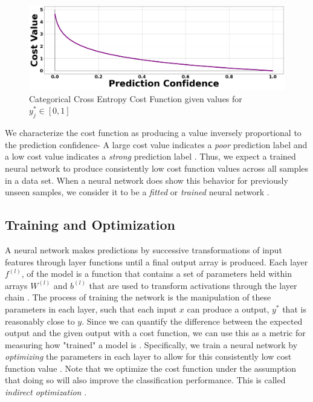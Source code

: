 \documentclass[conference,onecolumn,letterpaper]{IEEEtran}
\begin{document}
\begin{figure}[h]
    \centering
    \includegraphics[scale=0.14]{figures/CXELoss.png}
    \caption{Categorical Cross Entropy Cost Function given values for $y^*_{j} \in [0,1]$}
    \label{fig:CXELoss}
\end{figure}

We characterize the cost function as producing a value inversely proportional to the prediction confidence- A large cost value indicates a \textit{poor} prediction label and a low cost value indicates a \textit{strong} prediction label \cite{James,Virtanen}. Thus, we expect a trained neural network to produce consistently low cost function values across all samples in a data set. When a neural network does show this behavior for previously unseen samples, we consider it to be a \textit{fitted} or \textit{trained} neural network \cite{Geron,Goodfellow,James}.


\subsection{Training and Optimization}
\label{subsec:Training}

A neural network makes predictions by successive transformations of input features through layer functions until a final output array is produced. Each layer $f^{(l)}$, of the model is a function that contains a set of parameters held within arrays $W^{(l)}$ and $b^{(l)}$ that are used to transform activations through the layer chain \cite{Goodfellow}. The process of training the network is the manipulation of these parameters in each layer, such that each input $x$ can produce a output, $y^*$ that is reasonably close to $y$. Since we can quantify the difference between the expected output and the given output with a cost function, we can use this as a metric for measuring how "trained" a model is \cite{James}. Specifically, we train a neural network by \textit{optimizing} the parameters in each layer to allow for this consistently low cost function value \cite{Geron,Goodfellow}. Note that we optimize the cost function under the assumption that doing so will also improve the classification performance. This is called \textit{indirect optimization} \cite{Goodfellow}.
\end{document}

